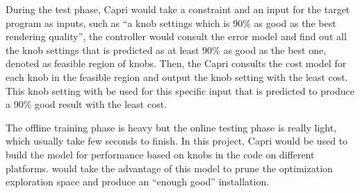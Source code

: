   During the test phase, Capri would take a
  constraint and an input for the target program as inputs, such as ``a knob
  settings which is 90\% as good as the best rendering quality'', the
  controller would consult the error model and find out
  all the knob settings that is predicted as at least 90\% as good as the best
  one, denoted as feasible region of knobs. Then, the Capri consults the
  cost model for each knob in the feasible region and output the knob setting
  with the least cost. This knob setting with be used for this specific input
  that is predicted to produce a 90\% good result with the least cost.

  The offline training phase is heavy but the online testing phase is really
  light, which usually take few seconds to finish. In this project, Capri would
  be used to build the model for \gem performance based on knobs in the code on
  different platforms. \atl would take the advantage of this model to prune
  the optimization exploration space and produce an ``enough good'' \gem
  installation.


